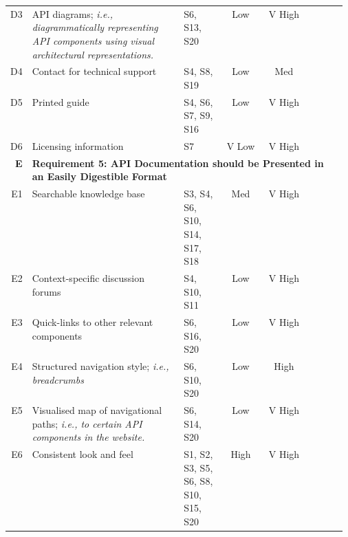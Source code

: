 {\begin{longtable}{rp{0.45\linewidth}|p{0.125\linewidth}|cc|ccc}
  D3&
  API diagrams; \textit{i.e., diagrammatically representing API components using visual architectural representations.}
  &
  \scriptsize S6, S13, S20 &
  \cellcolor[HTML]{f6b26b}Low&\cellcolor[HTML]{57bb8a}V High&\circlenotpresent{}&\circlenotpresent{}&\circlenotpresent{}\\

  D4&
  Contact for technical support
  &
  \scriptsize S4, S8, S19 &
  \cellcolor[HTML]{f6b26b}Low&\cellcolor[HTML]{ffd666}Med&\circlepresent{}&\circlepresent{}&\circlepresent{}\\

  D5&
  Printed guide
  &
  \scriptsize S4, S6, S7, S9, S16 &
  \cellcolor[HTML]{f6b26b}Low&\cellcolor[HTML]{57bb8a}V High&\circlenotpresent{}&\circlepresent{}&\circlepresent{}\\

  D6&
  Licensing information
  &
  \scriptsize S7 &
  \cellcolor[HTML]{e67c73}V Low&\cellcolor[HTML]{57bb8a}V High&\circlenotpresent{}&\circlenotpresent{}&\circlepartialpresent{}\\

  \midrule
  \textbf{E}&
  \multicolumn{7}{l}{\textbf{Requirement 5: API Documentation should be Presented in an Easily Digestible Format}}\\
  \midrule
  
  E1&
  Searchable knowledge base
  &
  \scriptsize S3, S4, S6, S10, S14, S17, S18 &
  \cellcolor[HTML]{ffd666}Med&\cellcolor[HTML]{57bb8a}V High&\circlepresent{}&\circlepresent{}&\circlepresent{}\\

  E2&
  Context-specific discussion forums
  &
  \scriptsize S4, S10, S11 &
  \cellcolor[HTML]{f6b26b}Low&\cellcolor[HTML]{57bb8a}V High&\circlepresent{}&\circlepresent{}&\circlepartialpresent{}\\

  E3&
  Quick-links to other relevant components
  &
  \scriptsize S6, S16, S20 &
  \cellcolor[HTML]{f6b26b}Low&\cellcolor[HTML]{57bb8a}V High&\circlenotpresent{}&\circlenotpresent{}&\circlenotpresent{}\\

  E4&
  Structured navigation style; \textit{i.e., breadcrumbs}
  &
  \scriptsize S6, S10, S20 &
  \cellcolor[HTML]{f6b26b}Low&\cellcolor[HTML]{a7c47d}High&\circlepresent{}&\circlepresent{}&\circlepresent{}\\

  E5&
  Visualised map of navigational paths; \textit{i.e., to certain API components in the website.}
  &
  \scriptsize S6, S14, S20 &
  \cellcolor[HTML]{f6b26b}Low&\cellcolor[HTML]{57bb8a}V High&\circlenotpresent{}&\circlenotpresent{}&\circlenotpresent{}\\

  {E6}&
  Consistent look and feel
  &
  \scriptsize {S1, S2, S3, S5, S6, S8, S10, S15, S20} &
  \cellcolor[HTML]{a7c47d}High&\cellcolor[HTML]{57bb8a}V High&\circlepresent{}&\circlepresent{}&\circlepresent{}\\
\end{longtable}
\normalsize}

